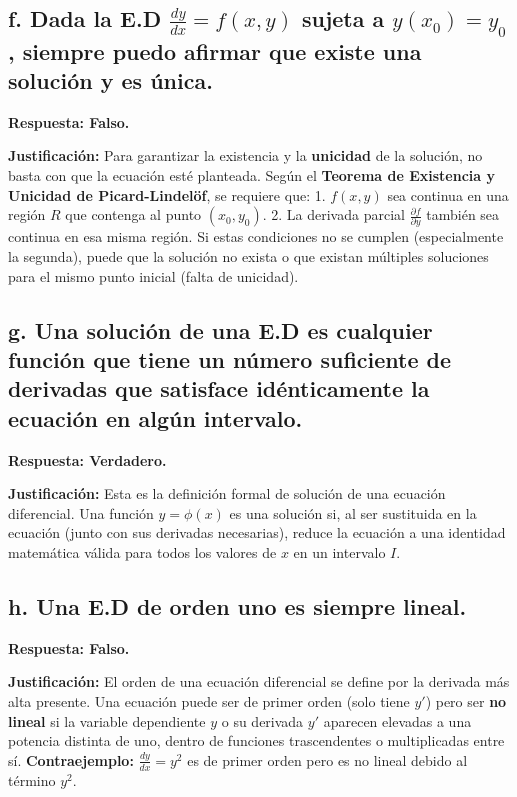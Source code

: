 \documentclass[a4paper]{article}
\begin{document}
\subsection*{f. Dada la E.D $\frac{dy}{dx} = f(x, y)$ sujeta a $y(x_0) = y_0$, siempre puedo afirmar que existe una solución y es única.}

\textbf{Respuesta: Falso.}

\textbf{Justificación:}
Para garantizar la existencia y la \textbf{unicidad} de la solución, no basta con que la ecuación esté planteada. Según el \textbf{Teorema de Existencia y Unicidad de Picard-Lindelöf}, se requiere que:
1. $f(x, y)$ sea continua en una región $R$ que contenga al punto $(x_0, y_0)$.
2. La derivada parcial $\frac{\partial f}{\partial y}$ también sea continua en esa misma región.
Si estas condiciones no se cumplen (especialmente la segunda), puede que la solución no exista o que existan múltiples soluciones para el mismo punto inicial (falta de unicidad).

\subsection*{g. Una solución de una E.D es cualquier función que tiene un número suficiente de derivadas que satisface idénticamente la ecuación en algún intervalo.}

\textbf{Respuesta: Verdadero.}

\textbf{Justificación:}
Esta es la definición formal de solución de una ecuación diferencial. Una función $y = \phi(x)$ es una solución si, al ser sustituida en la ecuación (junto con sus derivadas necesarias), reduce la ecuación a una identidad matemática válida para todos los valores de $x$ en un intervalo $I$.

\subsection*{h. Una E.D de orden uno es siempre lineal.}

\textbf{Respuesta: Falso.}

\textbf{Justificación:}
El orden de una ecuación diferencial se define por la derivada más alta presente. Una ecuación puede ser de primer orden (solo tiene $y'$) pero ser \textbf{no lineal} si la variable dependiente $y$ o su derivada $y'$ aparecen elevadas a una potencia distinta de uno, dentro de funciones trascendentes o multiplicadas entre sí.
\textbf{Contraejemplo:} $\frac{dy}{dx} = y^2$ es de primer orden pero es no lineal debido al término $y^2$.
\end{document}
